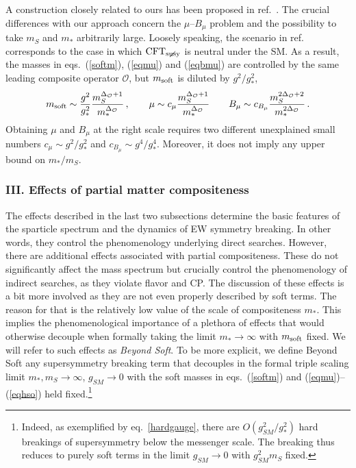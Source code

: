 \documentclass[a4paper,12pt]{article}
\newcommand{\be}{\begin{equation}}
\newcommand{\ee}{\end{equation}}
\def\O{\mathcal{O}}
\def\mst{m_*}
\def\mS{m_S}
\def\msoft{m_{\rm soft}}
\def\CFTs{{\rm CFT}_ {{\rm susy}\! \! \! \! \! \! \! \!\diagup \,\,\,}}
\begin{document}
A construction closely related to ours has been proposed in ref.~\cite{Okada:2011ed}. The crucial differences with our approach
concern the $\mu$--$B_\mu$ problem and the possibility to take $m_S$ and $m_*$ arbitrarily large. Loosely speaking, the scenario in ref.~\cite{Okada:2011ed}
corresponds to the case in which $\CFTs$ is neutral under the SM. As a result, the masses  in eqs.~(\ref{softm}), (\ref{eqmu}) and (\ref{eqbmu}) are controlled by the same leading composite operator $\O$, but $\msoft$ is diluted by $g^2/g_*^2$,
\be
\msoft \sim \frac{g^2}{g_*^2} \frac{m_S^{\Delta_\O+1}}{m_*^{\Delta_\O}}\,,\qquad\mu  \sim  c_\mu \frac{m_S^{\Delta_\O+1}}{m_*^{\Delta_\O}}\qquad B_\mu \sim c_{B_\mu}\frac{m_S^{2\Delta_\O+2}}{m_*^{2\Delta_\O}}\,.
\label{okada}
\ee
Obtaining $\mu$ and $B_\mu$ at the right scale requires two different unexplained small numbers $c_\mu \sim g^2/g_*^2$ and $c_{B_\mu}\sim g^4/g_*^4$. Moreover, it does not imply any upper bound on $\mst / \mS$.

\subsubsection*{III. Effects of partial matter compositeness}

The effects described in the last two subsections determine the basic features of the sparticle spectrum and the dynamics of EW symmetry breaking. In other words, they control the phenomenology underlying  direct searches. However, there are additional effects associated with partial compositeness. These do not significantly affect  the mass spectrum 
but crucially control the phenomenology of  indirect searches, as they  violate flavor and CP. The discussion of these effects is a bit more involved as they are not even properly described by soft terms. The reason for that is the relatively low value of the scale of compositeness $m_*$. This implies the phenomenological importance of a plethora of effects that would otherwise decouple when formally taking the limit $m_*\to \infty$ with $\msoft$ fixed.
We will refer to such effects as {\it Beyond Soft}. To be more explicit, we define Beyond Soft any supersymmetry breaking term that decouples in the   formal triple scaling limit $m_*, m_S\to \infty$, $g_{SM}\to 0$ with  the soft masses  in eqs.~(\ref{softm}) and  (\ref{eqmu})--(\ref{eqhso}) held fixed.\footnote{Indeed, as exemplified by eq.~\eqref{hardgauge}, there are  $O(g_{SM}^2/g_*^2)$ hard breakings of supersymmetry below the messenger scale. The breaking thus reduces to purely soft terms in the limit $g_{SM}\to 0$ with $g_{SM}^2 m_S$ fixed.}
\end{document}
